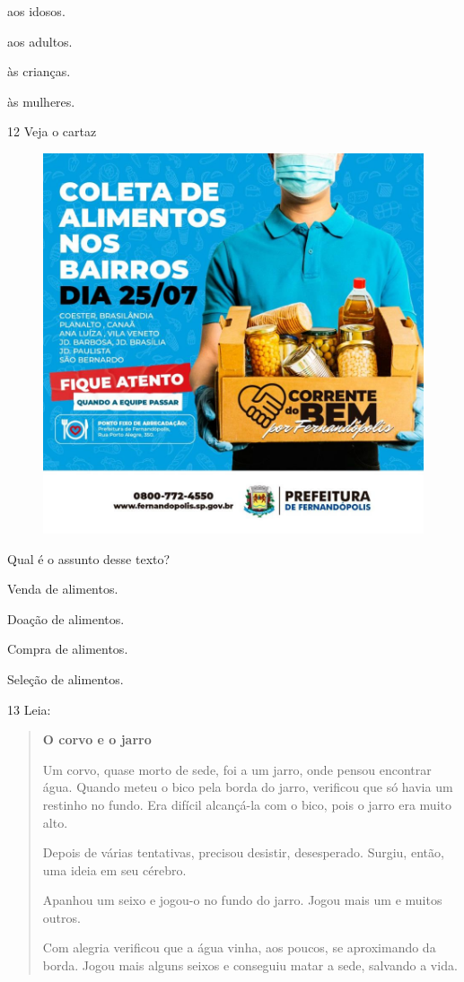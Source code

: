 \begin{escolha}
\item aos idosos.

\item aos adultos.

\item às crianças.

\item às mulheres.
\end{escolha}


\num{12} Veja o cartaz

\begin{figure}[htpb!]
\centering
\includegraphics[width=.5\textwidth]{media/image171.jpeg}
\end{figure}


Qual é o assunto desse texto?

\begin{escolha}
\item Venda de alimentos.

\item Doação de alimentos.

\item Compra de alimentos.

\item Seleção de alimentos.
\end{escolha}


\num{13} Leia:

\begin{quote}
\textbf{O corvo e o jarro}

Um corvo, quase morto de sede, foi a um jarro, onde pensou encontrar
água. Quando meteu o bico pela borda do jarro, verificou que só havia um
restinho no fundo. Era difícil alcançá-la com o bico, pois o jarro era
muito alto.

Depois de várias tentativas, precisou desistir, desesperado. Surgiu,
então, uma ideia em seu cérebro.

Apanhou um seixo e jogou-o no fundo do jarro. Jogou mais
um e muitos outros.

Com alegria verificou que a água vinha, aos poucos, se aproximando da
borda. Jogou mais alguns seixos e conseguiu matar a sede, salvando a
vida.
\end{quote}

